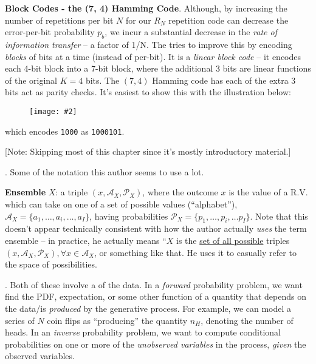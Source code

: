 \documentclass[11pt]{article}
\newcommand\myfig[2][0.3\textwidth]{\begin{figure}[h!]\centering\texttt{[image: \#2]}\end{figure}}
\newcommand\myspace[1][]{\vspace{#1\bigskipamount}}
\newcommand\p{\Needspace{10\baselineskip} \noindent}
\begin{document}
\begin{compactitem}
	\item \textbf{Block Codes - the (7, 4) Hamming Code}. Although, by increasing the number of repetitions per bit $N$ for our $R_N$ repetition code can decrease the error-per-bit probability $p_b$, we incur a substantial decrease in the \textit{rate of information transfer} -- a factor of 1/N. The  tries to improve this by encoding \textit{blocks} of bits at a time (instead of per-bit). It is a \textit{linear block code} -- it encodes each 4-bit block into a 7-bit block, where the additional 3 bits are linear functions of the original $K=4$ bits. The $(7, 4)$ Hamming code has each of the extra 3 bits act as parity checks. It's easiest to show this with the illustration below:
	\myfig[0.4\textwidth]{ITILA_1_13.png}
	
	which encodes \texttt{1000} as \texttt{1000101}.
\end{compactitem}




{\footnotesize [Note: Skipping most of this chapter since it's mostly introductory material.]}

\myspace
\p {}. Some of the notation this author seems to use a lot.
\begin{compactitem}
	\item \textbf{Ensemble} $X$: a triple $(x, \mathcal{A}_X, \mathcal{P}_X)$, where the outcome $x$ is the value of a R.V. which can take on one of a set of possible values (``alphabet''), $\mathcal{A}_X = \{a_1, \ldots, a_i, \ldots, a_I\}$, having probabilities $\mathcal{P}_X = \{p_1, \ldots, p_i, \ldots p_I\}$. Note that this doesn't appear technically consistent with how the author actually \textit{uses} the term ensemble -- in practice, he actually means ``$X$ is the \underline{set of all possible} triples $(x, \mathcal{A}_X, \mathcal{P}_X), \forall x \in \mathcal{A}_X$, or something like that. He uses it to casually refer to the space of possibilities.
\end{compactitem}

\myspace
\p {}. Both of these involve a  of the data. In a \textit{forward} probability problem, we want find the PDF, expectation, or some other function of a quantity that depends on the data/is \textit{produced} by the generative process. For example, we can model a series of $N$ coin flips as ``producing'' the quantity $n_H$, denoting the number of heads. In an \textit{inverse} probability problem, we want to compute conditional probabilities on one or more of the \textit{unobserved variables} in the process, \textit{given} the observed variables. 
\end{document}
